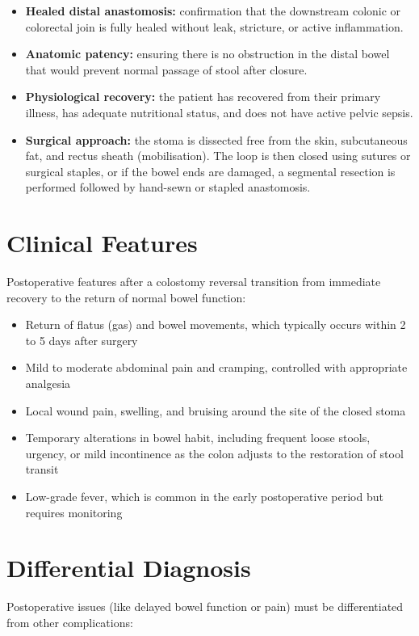 \begin{itemize}
    \item \textbf{Healed distal anastomosis:} confirmation that the downstream colonic or colorectal join is fully healed without leak, stricture, or active inflammation.
    \item \textbf{Anatomic patency:} ensuring there is no obstruction in the distal bowel that would prevent normal passage of stool after closure.
    \item \textbf{Physiological recovery:} the patient has recovered from their primary illness, has adequate nutritional status, and does not have active pelvic sepsis.
    \item \textbf{Surgical approach:} the stoma is dissected free from the skin, subcutaneous fat, and rectus sheath (mobilisation). The loop is then closed using sutures or surgical staples, or if the bowel ends are damaged, a segmental resection is performed followed by hand-sewn or stapled anastomosis.
\end{itemize}

\section*{Clinical Features}
Postoperative features after a colostomy reversal transition from immediate recovery to the return of normal bowel function:

\begin{itemize}
    \item Return of flatus (gas) and bowel movements, which typically occurs within 2 to 5 days after surgery
    \item Mild to moderate abdominal pain and cramping, controlled with appropriate analgesia
    \item Local wound pain, swelling, and bruising around the site of the closed stoma
    \item Temporary alterations in bowel habit, including frequent loose stools, urgency, or mild incontinence as the colon adjusts to the restoration of stool transit
    \item Low-grade fever, which is common in the early postoperative period but requires monitoring
\end{itemize}

\section*{Differential Diagnosis}
Postoperative issues (like delayed bowel function or pain) must be differentiated from other complications:

